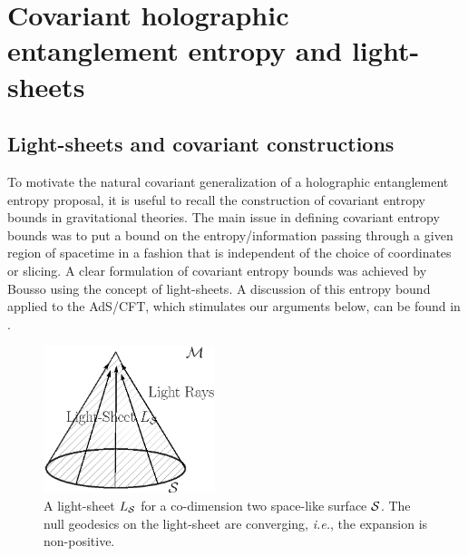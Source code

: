 \documentclass[12pt]{article}
\def\ie{{\it i.e.}}
\begin{document}
\section{Covariant holographic entanglement entropy and light-sheets}
\label{cholols}
\subsection{Light-sheets and covariant constructions}
\label{lsmotive}

To motivate the natural covariant generalization of a holographic entanglement
 entropy proposal, it is useful to recall the construction of covariant
  entropy bounds in gravitational theories. The main issue in defining covariant entropy bounds
  was to put a bound on the entropy/information passing
   through a given region of spacetime in a fashion that is independent
    of the choice of coordinates or slicing. A clear formulation of
    covariant entropy bounds was achieved by Bousso
     \cite{Bousso:1999xy, Bousso:1999cb, Bousso:2002ju} using the concept of
     light-sheets.
     A discussion of this entropy bound applied to the AdS/CFT,
     which stimulates our arguments below, can be found in \cite{Bousso:2001cf}.


\begin{figure}[htbp]
\begin{center}
\includegraphics[width=5cm]{bousso}
\caption{A light-sheet $L_{{\cal S}}$ for a co-dimension two
space-like surface ${\cal S}$. The null geodesics on the light-sheet
are converging, \ie, the expansion is non-positive. }
\label{boussofig}
\end{center}
\end{figure}
\end{document}
